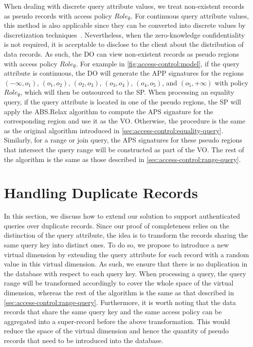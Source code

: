 When dealing with discrete query attribute values, we treat non-existent records as pseudo records with access policy ${Role}_{\emptyset}$. For continuous query attribute values, this method is also applicable since they can be converted into discrete values by discretization techniques~\cite{Kotsiantis2006}. Nevertheless, when the zero-knowledge confidentiality is not required, it is acceptable to disclose to the client about the distribution of data records. As such, the DO can view non-existent records as pseudo regions with access policy ${Role}_{\emptyset}$. For example in \cref{fig:access-control:model}, if the query attribute is continuous, the DO will generate the APP signatures for the regions $(-\infty,o_1)$, $(o_1, o_2)$, $(o_2, o_3)$, $(o_3, o_4)$, $(o_4, o_5)$, and $(o_5, +\infty)$ with policy ${Role}_{\emptyset}$, which will then be outsourced to the SP\@. When processing an equality query, if the query attribute is located in one of the pseudo regions, the SP will apply the \textsf{ABS.Relax} algorithm to compute the APS signature for the corresponding region and use it as the VO\@. Otherwise, the procedure is the same as the original algorithm introduced in \cref{sec:access-control:equality-query}. Similarly, for a range or join query, the APS signatures for these pseudo regions that intersect the query range will be constructed as part of the VO\@. The rest of the algorithm is the same as those described in \cref{sec:access-control:range-query}.

\section{Handling Duplicate Records}\label{sec:access-control:dup}

In this section, we discuss how to extend our solution to support authenticated queries over duplicate records. Since our proof of completeness relies on the distinction of the query attribute, the idea is to transform the records sharing the same query key into distinct ones. To do so, we propose to introduce a new virtual dimension by extending the query attribute for each record with a random value in this virtual dimension. As such, we ensure that there is no duplication in the database with respect to each query key.
When processing a query, the query range will be transformed accordingly to cover the whole space of the virtual dimension, whereas the rest of the algorithm is the same as that described in \cref{sec:access-control:range-query}.
Furthermore, it is worth noting that the data records that share the same query key and the same access policy can be aggregated into a super-record before the above transformation. This would reduce the space of the virtual dimension and hence the quantity of pseudo records that need to be introduced into the database.

